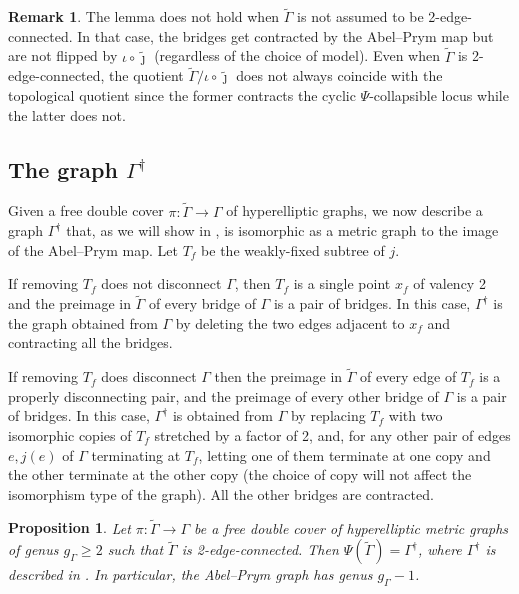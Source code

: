 \documentclass[11pt]{article}
\newtheorem{prop}[theo]{Proposition}
\theoremstyle{definition}
\newtheorem{rema}[theo]{Remark}
\numberwithin{equation}{section}
\theoremstyle{definition}
\newcommand{\tGa}{\widetilde{\Gamma}}
\newcommand{\Ga}{\Gamma}
\newcommand{\tj}{\widetilde{\jmath}}
\newcommand{\wt}[1]{\widetilde{#1}}
\begin{document}
\begin{rema}
The lemma does not hold when $\wt\Gamma$ is not assumed to be 2-edge-connected. In that case, the bridges get contracted by the Abel--Prym map but are not flipped by $\iota\circ\tj$ (regardless of the choice of model).  
Even when $\wt\Gamma$ is 2-edge-connected, the quotient $\wt\Gamma/\iota\circ\tj$ does not always coincide with the topological quotient since the former contracts the cyclic $\Psi$-collapsible locus while the latter does not. 
\end{rema}

\subsection{The graph \texorpdfstring{$\Gamma^{\dagger}$}{Gamma\textdagger}}\label{GammaDagger}
Given a free double cover $\pi:\wt\Gamma\to\Gamma$ of hyperelliptic graphs, we now describe a graph $\Gamma^{\dagger}$ that, as we will show in , is isomorphic as a metric graph to the image of the Abel--Prym map. 
Let $T_f$ be the weakly-fixed subtree of $j$. 

If removing $T_f$ does not disconnect $\Gamma$, then $T_f$ is a single point $x_f$ of valency 2 and the preimage in $\wt\Gamma$ of every bridge of $\Gamma$ is a pair of bridges.
In this case,   $\Gamma^{\dagger}$ is the graph obtained from $\Gamma$ by deleting the two edges adjacent to $x_f$ and contracting all the bridges. 

If removing $T_f$ does disconnect $\Gamma$ then the preimage in $\wt\Gamma$ of every edge of $T_f$ is a properly disconnecting pair, and the preimage of every other bridge of $\Gamma$ is a pair of bridges. In this case, 
$\Gamma^{\dagger}$ is obtained from $\Gamma$ by replacing $T_f$ with two isomorphic copies of $T_f$ stretched by a factor of 2, and, for any other pair of edges $e,j(e)$ of $\Gamma$ terminating at $T_f$, letting one of them terminate at one copy and the other terminate at the other copy (the choice of copy will not affect the isomorphism type of the graph). All the other bridges are contracted. 
 
\begin{prop} \label{structureOfImage}
 Let $\pi\colon \tGa\to \Gamma$ be a free double cover of hyperelliptic metric graphs of genus $g_{\Gamma}\geq 2$ such that $\tGa$ is 2-edge-connected. Then $\Psi(\wt\Gamma) = \Gamma^{\dagger}$, where $\Gamma^{\dagger}$ is described in .
In particular, the Abel--Prym graph has genus $g_{\Ga}-1$.
\end{prop}
\end{document}
